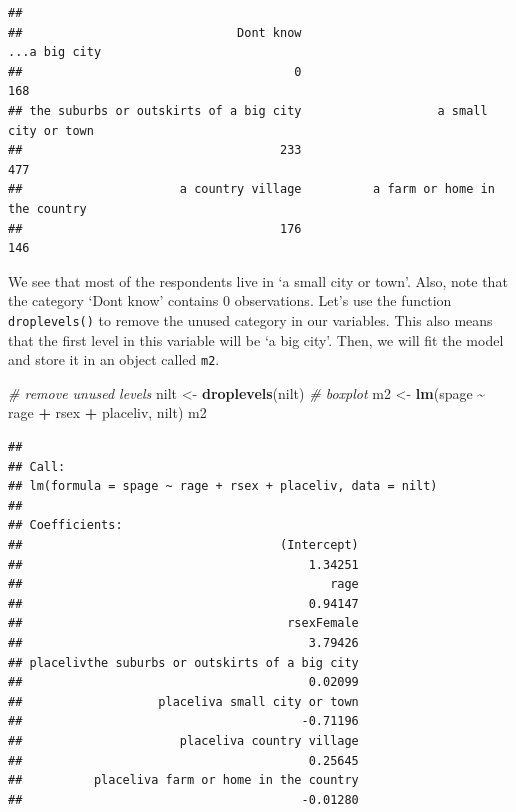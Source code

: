 \documentclass[
]{book}
\newenvironment{Shaded}{\begin{snugshade}}{\end{snugshade}}
\newcommand{\CommentTok}[1]{\textcolor[rgb]{0.56,0.35,0.01}{\textit{#1}}}
\newcommand{\FunctionTok}[1]{\textcolor[rgb]{0.13,0.29,0.53}{\textbf{#1}}}
\newcommand{\NormalTok}[1]{#1}
\newcommand{\OtherTok}[1]{\textcolor[rgb]{0.56,0.35,0.01}{#1}}
\newcommand{\SpecialCharTok}[1]{\textcolor[rgb]{0.81,0.36,0.00}{\textbf{#1}}}
\begin{document}
\begin{verbatim}
## 
##                              Dont know                          ...a big city 
##                                      0                                    168 
## the suburbs or outskirts of a big city                   a small city or town 
##                                    233                                    477 
##                      a country village          a farm or home in the country 
##                                    176                                    146
\end{verbatim}

We see that most of the respondents live in `a small city or town'. Also, note that the category `Dont know' contains 0 observations. Let's use the function \texttt{droplevels()} to remove the unused category in our variables. This also means that the first level in this variable will be `a big city'. Then, we will fit the model and store it in an object called \texttt{m2}.

\begin{Shaded}
\begin{Highlighting}[]
\CommentTok{\# remove unused levels}
\NormalTok{nilt }\OtherTok{\textless{}{-}} \FunctionTok{droplevels}\NormalTok{(nilt)}
\CommentTok{\# boxplot}
\NormalTok{m2 }\OtherTok{\textless{}{-}} \FunctionTok{lm}\NormalTok{(spage }\SpecialCharTok{\textasciitilde{}}\NormalTok{ rage }\SpecialCharTok{+}\NormalTok{ rsex }\SpecialCharTok{+}\NormalTok{ placeliv, nilt)}
\NormalTok{m2}
\end{Highlighting}
\end{Shaded}

\begin{verbatim}
## 
## Call:
## lm(formula = spage ~ rage + rsex + placeliv, data = nilt)
## 
## Coefficients:
##                                    (Intercept)  
##                                        1.34251  
##                                           rage  
##                                        0.94147  
##                                     rsexFemale  
##                                        3.79426  
## placelivthe suburbs or outskirts of a big city  
##                                        0.02099  
##                   placeliva small city or town  
##                                       -0.71196  
##                      placeliva country village  
##                                        0.25645  
##          placeliva farm or home in the country  
##                                       -0.01280
\end{verbatim}
\end{document}
